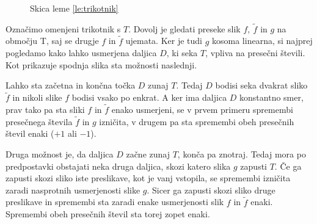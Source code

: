 \documentclass[mat1]{fmfdelo}
\begin{document}
\begin{figure}[h!]
\centering
{}
\caption{Skica leme \ref{le:trikotnik}}
\end{figure}

\proof
Označimo omenjeni trikotnik s $T$. Dovolj je gledati preseke slik $f,\ \widetilde{f}$ in $g$ na območju T, saj se drugje $f$ in $\widetilde{f}$ ujemata. Ker je tudi $g$ kosoma linearna, si najprej pogledamo kako lahko usmerjena daljica $D$, ki seka $T$, vpliva na presečni števili. Kot prikazuje spodnja slika sta možnosti naslednji.

Lahko sta začetna in končna točka $D$ zunaj $T$. Tedaj $D$ bodisi seka dvakrat sliko $\widetilde{f}$ in nikoli slike $f$ bodisi vsako po enkrat. A ker ima daljica $D$ konstantno smer, prav tako pa sta sliki $f$ in $\widetilde{f}$ enako usmerjeni, se v prvem primeru spremembi presečnega števila $\widetilde{f}$ in $g$ izničita, v drugem pa sta spremembi obeh presečnih števil enaki ($+1$ ali $-1$).

Druga možnost je, da daljica $D$ začne zunaj $T$, konča pa znotraj. Tedaj mora po predpostavki obstajati neka druga daljica, skozi katero slika $g$ zapusti $T$. Če ga zapusti skozi sliko iste preslikave, kot je vanj vstopila, se spremembi izničita zaradi nasprotnih usmerjenosti slike $g$. Sicer ga zapusti skozi sliko druge preslikave in spremembi sta zaradi enake usmerjenosti slik $f$ in $\widetilde{f}$ enaki. Spremembi obeh presečnih števil sta torej zopet enaki.


\begin{center}
\end{center}
\end{document}
